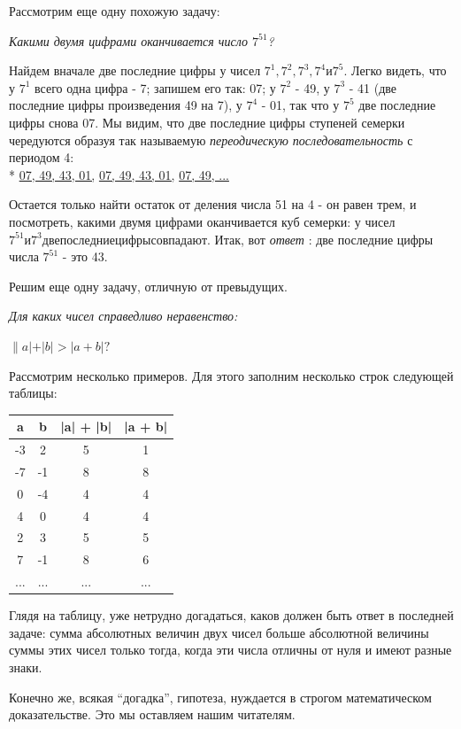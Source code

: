 \documentclass[main.tex]{subfiles}
\begin{document}
\begin{multicols}{2}
Рассмотрим еще одну похожую задачу:

\textit{Какими двумя цифрами оканчивается число $7^{51}$?}

Найдем вначале две последние цифры у чисел $7^{1}, 7^{2}, 7^{3}, 7^{4} и 7^{5}$. Легко видеть, что у $7^{1}$ всего одна цифра - 7; запишем его так: 07; у $7^{2}$ - 49, у $7^{3}$ - 41 (две последние цифры произведения 49 на 7), у $7^{4}$ - 01, так что у $7^{5}$ две последние цифры снова 07. Мы видим, что две последние цифры ступеней семерки чередуются образуя так называемую \textit{переодическую последовательность} с периодом 4:
\\*
\underline{07, 49, 43, 01,} \underline{07, 49, 43, 01,} \underline{07, 49, ...}

Остается только найти остаток от деления числа 51 на 4 - он равен трем, и посмотреть, какими двумя цифрами оканчивается куб семерки: у чисел $7^{51} и 7^{3} две последние цифры совпадают$. Итак, вот \emph{ответ} : две последние цифры числа $7^{51}$ - это 43.

Решим еще одну задачу, отличную от превыдущих.

\textit{Для каких чисел справедливо неравенство:}

$\|a| + |b| > |a + b|?$

Рассмотрим несколько примеров.
Для этого заполним несколько строк следующей таблицы:
\begin{center}
\begin{tabular}{ |c|c|c|c| } 
\hline
 a & b & |a| + |b| & |a + b| \\ [0.5ex] 
 \hline
 -3  & 2 & 5 & 1 \\ 
 -7  & -1 & 8 & 8 \\ 
 0 & -4 & 4 & 4 \\ 
  4 & 0 & 4 & 4 \\ 
   2 & 3 & 5 & 5 \\ 
    7 & -1 & 8 & 6 \\ 
    ... & ... & ... & ... \\ [0.7ex]
 \hline
\end{tabular}
\end{center}
Глядя на таблицу, уже нетрудно догадаться, каков должен быть ответ в последней задаче: сумма абсолютных величин двух чисел больше абсолютной величины суммы этих чисел только тогда, когда эти числа отличны от нуля и имеют разные знаки.

Конечно же, всякая ``догадка'', гипотеза, нуждается в строгом математическом доказательстве. Это мы оставляем нашим читателям.


\end{multicols}
\end{document}
